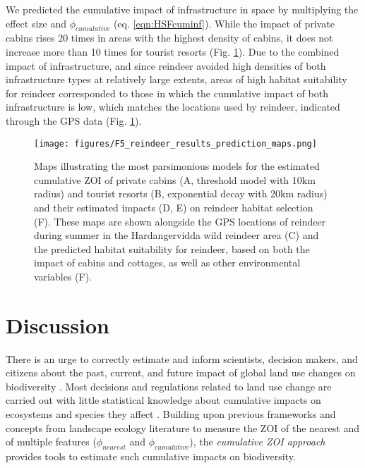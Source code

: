 \documentclass[titlepage]{article}
\begin{document}
We predicted the cumulative impact of infrastructure in space by multiplying the effect size and $\phi_{cumulative}$ (eq. \ref{eqn:HSFcuminf}). While the impact of private cabins rises 20 times in areas with the highest density of cabins, it does not increase more than 10 times for tourist resorts (Fig. \ref{fig:prediction_maps}). Due to the combined impact of infrastructure, and since reindeer
avoided high densities of both infrastructure types at relatively large extents, 
areas of high habitat suitability for reindeer corresponded to those in which the
cumulative impact of both infrastructure is low, which matches the
locations used by reindeer, indicated through the GPS data (Fig. \ref{fig:prediction_maps}).

\begin{figure}[h]
\centering
\texttt{[image: figures/F5\_reindeer\_results\_prediction\_maps.png]}
\caption{\label{fig:prediction_maps} Maps illustrating the most parsimonious models for the estimated cumulative ZOI of private cabins (A, threshold model with 10km radius) and tourist resorts (B, exponential decay with 20km radius) and their estimated impacts (D, E) on reindeer habitat selection (F). These maps are shown alongside the GPS locations of reindeer during summer in the Hardangervidda wild reindeer area (C) and the predicted habitat suitability for reindeer, based on both the impact of cabins and cottages, as well as other environmental variables (F).}
\end{figure}

\section{Discussion}

There is an urge to correctly estimate and inform scientists, decision makers, and citizens about the past, current, and future impact of global land use changes on biodiversity  \citep{laurance_conservation_2018}. Most decisions and regulations related to land use change are carried out with little statistical knowledge about cumulative impacts on ecosystems and species they affect \citep{johnson_regulating_2011,laurance_roads_2017}. Building upon previous frameworks \citep{naugle_unifying_2011} and concepts from landscape ecology literature to measure the ZOI of the nearest and of multiple features ($\phi_{nearest}$ and $\phi_{cumulative}$), the \textit{cumulative ZOI approach} provides tools to estimate such cumulative impacts on biodiversity. 
\end{document}

